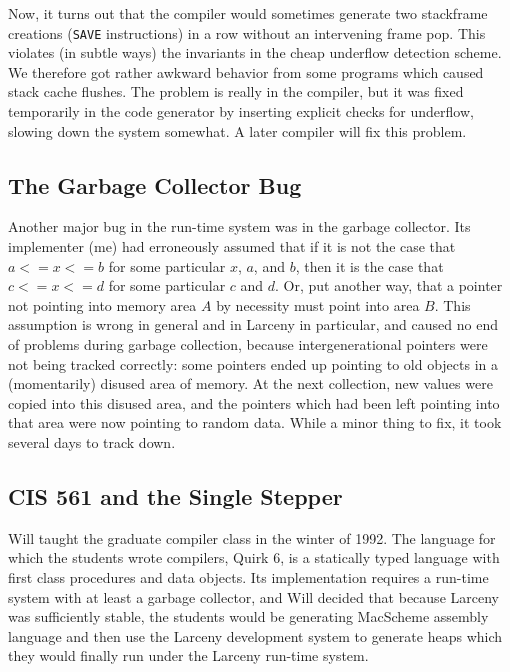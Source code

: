 Now, it turns out that the compiler would sometimes generate two stackframe
creations ({\tt SAVE} instructions) in a row without an intervening frame pop.
This violates (in subtle ways) the invariants in the cheap underflow
detection scheme. We therefore got rather awkward behavior from some
programs which caused stack cache flushes.  The problem is really in the
compiler, but it was fixed temporarily in the code generator by inserting
explicit checks for underflow, slowing down the system somewhat. A later
compiler will fix this problem.


\subsection{The Garbage Collector Bug}

Another major bug in the run-time system was in the garbage collector.  Its
implementer (me) had erroneously assumed that if it is not the case that $a
<= x <= b$ for some particular $x$, $a$, and $b$, then it is the case that
$c <= x <= d$ for some particular $c$ and $d$. Or, put another way, that a
pointer not pointing into memory area $A$ by necessity must point into area
$B$. This assumption is wrong in general and in Larceny in particular, and
caused no end of problems during garbage collection, because
intergenerational pointers were not being tracked correctly: some pointers
ended up pointing to old objects in a (momentarily) disused area of memory.
At the next collection, new values were copied into this disused area, and
the pointers which had been left pointing into that area were now pointing
to random data.  While a minor thing to fix, it took several days to track
down.

\subsection{CIS 561 and the Single Stepper}

Will taught the graduate compiler class in the winter of 1992. The language
for which the students wrote compilers, Quirk 6, is a statically typed
language with first class procedures and data objects. Its implementation
requires a run-time system with at least a garbage collector, and Will
decided that because Larceny was sufficiently stable, the students would
be generating MacScheme assembly language and then use the Larceny
 development system
to generate heaps which they would finally run under the Larceny run-time
system.

